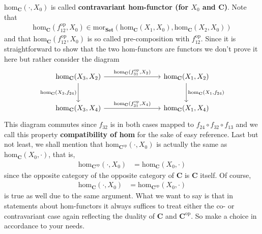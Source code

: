 $\mathrm{hom}_{\mathbf{C}}(\cdot,X_{0})$ is called \textbf{contravariant hom-functor (for $X_{0}$ and $\mathbf{C}$)}. Note that
\begin{align*}
  \mathrm{hom}_{\mathbf{C}}(f_{12}^{\mathrm{op}},X_{0})
  \in
  \mathrm{mor}_{\mathbf{Set}}
  \left(
    \mathrm{hom}_{\mathbf{C}}(X_{1},X_{0}),
    \mathrm{hom}_{\mathbf{C}}(X_{2},X_{0})
  \right)
\end{align*}
and that $\mathrm{hom}_{\mathbf{C}}(f_{12}^{\mathrm{op}},X_{0})$ is so called pre-composition with $f_{12}^{\mathrm{op}}$. Since it is straightforward to show that the two hom-functors are functors we don't prove it here but rather consider the diagram
\[
\begin{tikzcd}[row sep=large,column sep=8em]
  \mathrm{hom}_{\mathbf{C}}(X_{3},X_{2})
  \arrow{r}{\mathrm{hom}_{\mathbf{C}}(f_{31}^{\mathrm{op}},X_{2})}
  \arrow[swap]{d}{\mathrm{hom}_{\mathbf{C}}(X_{3},f_{24})}
  &
  \mathrm{hom}_{\mathbf{C}}(X_{1},X_{2})
  \arrow{d}{\mathrm{hom}_{\mathbf{C}}(X_{1},f_{24})}
  \\
  \mathrm{hom}_{\mathbf{C}}(X_{3},X_{4})
  \arrow{r}{\mathrm{hom}_{\mathbf{C}}(f_{31}^{\mathrm{op}},X_{4})}
  &
  \mathrm{hom}_{\mathbf{C}}(X_{1},X_{4})
\end{tikzcd}
\]
This diagram commutes since $f_{32}$ is in both cases mapped to $f_{24} \circ f_{32} \circ f_{13}$ and we call this property \textbf{compatibility of hom} for the sake of easy reference. Last but not least, we shall mention that $\mathrm{hom}_{\mathbf{C}^{\mathrm{op}}}(\cdot,X_{0})$ is actually the same as $\mathrm{hom}_{\mathbf{C}}(X_{0},\cdot)$, that is,
\begin{align*}
  \mathrm{hom}_{\mathbf{C}^{\mathrm{op}}}(\cdot,X_{0})
  &=
  \mathrm{hom}_{\mathbf{C}}(X_{0},\cdot)
\end{align*}
since the opposite category of the opposite category of $\mathbf{C}$ is $\mathbf{C}$ itself. Of course,
\begin{align*}
  \mathrm{hom}_{\mathbf{C}}(\cdot,X_{0})
  &=
  \mathrm{hom}_{\mathbf{C}^{\mathrm{op}}}(X_{0},\cdot)
\end{align*}
is true as well due to the same argument. What we want to say is that in statements about hom-functors it always suffices to treat either the co- or contravariant case again reflecting the duality of $\mathbf{C}$ and $\mathbf{C}^{\mathrm{op}}$. So make a choice in accordance to your needs.

